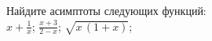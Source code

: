 \documentclass[a4paper,12pt]{article}
\def\dfrac{\displaystyle\frac}
\begin{document}
Найдите асимптоты следующих функций:\\
 $x+\frac1x$;
 $\dfrac{x+3}{2-x}$;
 $\sqrt{x\,(1+x)}$;



\end{document}
